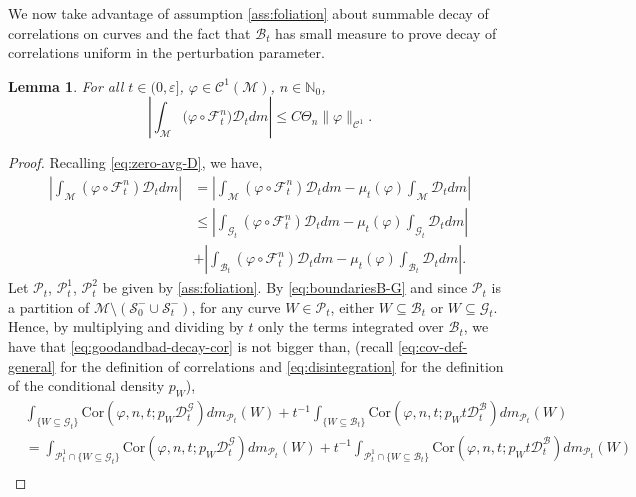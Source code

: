 \documentclass{amsart}
\numberwithin{equation}{section}
\newtheorem{lemma}[theorem]{Lemma}
\newcommand\ve{\varepsilon}
\newcommand\vf{\varphi}
\renewcommand{\le}{\leqslant}
\newcommand\cB{{\mathcal B}}
\newcommand\cC{{\mathcal C}}
\newcommand\cF{{\mathcal F}}
\newcommand\cG{{\mathcal G}}
\newcommand\cM{{\mathcal M}}
\newcommand\cS{{\mathcal S}}
\newcommand\bN{{\mathbb N}}
\newcommand{\Deriv}{\mathcal D}
\newcommand{\cov}{ \text{Cor} }
\begin{document}
We now take advantage of assumption \ref{ass:foliation} about summable decay of correlations on curves and the fact that \(\cB_t\) has small measure to prove decay of correlations uniform in the perturbation parameter.

\begin{lemma}
  \label{lem:decay-tot}
  For all \(t \in (0,\ve]\), \(\vf \in \cC^1(\cM)\), \(n \in \bN_{0}\),
  \[
  \left|\int_{\cM}\bigl(\vf\circ \cF_t^n \bigr)\Deriv_t  dm  \right| \le C\Theta_n\|\vf\|_{\cC^1}.
  \]
\end{lemma}
\begin{proof}
Recalling \eqref{eq:zero-avg-D}, we have, 
\begin{equation}\label{eq:goodandbad-decay-cor}
\begin{split}
     \left|\int_{\cM}\left(\vf \circ \cF_t^n\right) \Deriv_t dm\right| &= \left|\int_{\cM}\left(\vf \circ \cF_t^n\right) \Deriv_t dm - \mu_t(\vf) \int_{\cM}\Deriv_t dm\right| \\
&\le \left| \int_{\cG_t} \left(\vf\circ \cF_t^n\right) \Deriv_t dm - \mu_t(\vf)  \int_{\cG_t}\Deriv_t dm\right|\\
&+  \left|\int_{\cB_t} \left(\vf\circ \cF_t^n\right) \Deriv_t dm- \mu_t(\vf) \int_{\cB_t}\Deriv_t dm\right|.
\end{split}
\end{equation}
Let \(\mathscr P_t\), \(\mathscr P_t^{1}\), \(\mathscr P_t^2\) be given by \ref{ass:foliation}. By \eqref{eq:boundariesB-G} and since \(\mathscr P_t\) is a partition of \(\cM \setminus (\cS_0^{-} \cup \cS_t^{-})\), for any curve \(W \in \mathscr P_t\), either \(W\subseteq \cB_t\) or \(W \subseteq \cG_t\). Hence, by multiplying and dividing by \(t\) only the terms integrated over \(\cB_t\), we have that \eqref{eq:goodandbad-decay-cor} is not bigger than, (recall \eqref{eq:cov-def-general} for the definition of correlations and \eqref{eq:disintegration} for the definition of the conditional density \(p_W\)),
\[
\begin{split}
   & \int_{\{W \subseteq \cG_t\}}\!\!\!\!\! \!\!\!\! \cov(\vf, n, t; p_W  \Deriv_t^{\cG})dm_{\mathscr P_t}(W)  +t^{-1} \int_{\{W \subseteq \cB_t\}}\!\!\!\!\!\!\!\!\!\!\!\!\!\!\!\!\! \cov(\vf, n, t;  p_W t \Deriv_t^{\cB}) dm_{\mathscr P_t}(W)\\
  &= \int_{\mathscr P_t^{1} \cap \{W \subseteq \cG_t\}}\!\!\!\!\!\!\!\!\!\!\!\!\!\!\!\!\!\!\!\! \!\!\!\! \cov(\vf, n, t;  p_W \Deriv_t^{\cG})dm_{\mathscr P_t}(W)  +t^{-1} \int_{\mathscr P_t^{1} \cap \{W \subseteq \cB_t\}}\!\!\!\!\!\!\!\!\!\!\!\!\!\!\!\!\!\!\!\!\!\!\!\! \cov(\vf, n, t; p_W t \Deriv_t^{\cB}) dm_{\mathscr P_t}(W)   \\

\end{split}\]
\end{proof}
\end{document}
